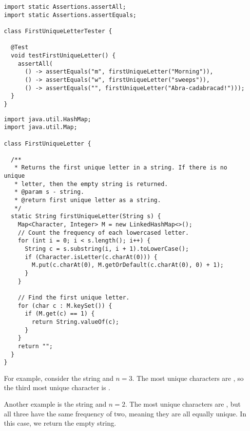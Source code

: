 \begin{cl}[]{}
\begin{lstlisting}[language=MyJava]
import static Assertions.assertAll;
import static Assertions.assertEquals;

class FirstUniqueLetterTester {

  @Test
  void testFirstUniqueLetter() {
    assertAll(
      () -> assertEquals("m", firstUniqueLetter("Morning")),
      () -> assertEquals("w", firstUniqueLetter("sweeps")),
      () -> assertEquals("", firstUniqueLetter("Abra-cadabracad!")));
  }
}
\end{lstlisting}
\end{cl}

\begin{cl}[]{}
\begin{lstlisting}[language=MyJava]
import java.util.HashMap;
import java.util.Map;

class FirstUniqueLetter {

  /**
   * Returns the first unique letter in a string. If there is no unique
   * letter, then the empty string is returned.
   * @param s - string.
   * @return first unique letter as a string.
   */
  static String firstUniqueLetter(String s) {
    Map<Character, Integer> M = new LinkedHashMap<>();
    // Count the frequency of each lowercased letter.
    for (int i = 0; i < s.length(); i++) {
      String c = s.substring(i, i + 1).toLowerCase();
      if (Character.isLetter(c.charAt(0))) {
        M.put(c.charAt(0), M.getOrDefault(c.charAt(0), 0) + 1);
      }
    }

    // Find the first unique letter.
    for (char c : M.keySet()) {
      if (M.get(c) == 1) {
        return String.valueOf(c);
      }
    }
    return "";
  }
}
\end{lstlisting}
\end{cl}


For example, consider the string  and $n=3$. The most unique characters are , so the third most unique character is .

Another example is the string  and $n=2$. The most unique characters are , but all three have the same frequency of two, meaning they are all equally unique. In this case, we return the empty string.

